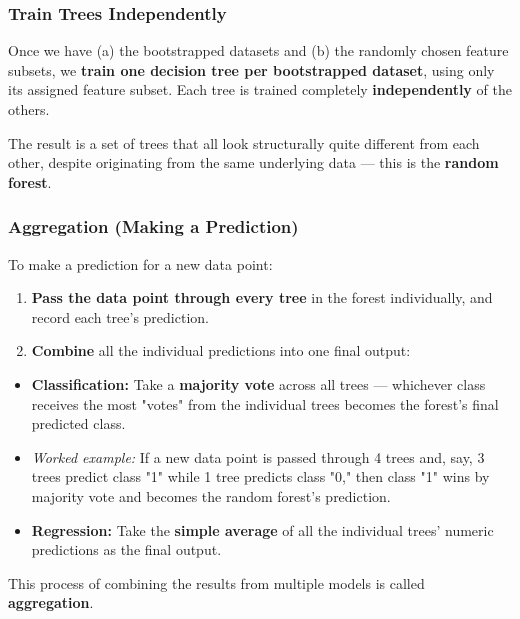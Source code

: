 \documentclass[12pt,openany]{book}
\begin{document}
\subsubsection{Train Trees Independently}


Once we have (a) the bootstrapped datasets and (b) the randomly chosen feature subsets, we \textbf{train one decision tree per bootstrapped dataset}, using only its assigned feature subset. Each tree is trained completely \textbf{independently} of the others.

The result is a set of trees that all look structurally quite different from each other, despite originating from the same underlying data --- this is the \textbf{random forest}.

\subsubsection{Aggregation (Making a Prediction)}


To make a prediction for a new data point:

\begin{enumerate}[leftmargin=*]
    \item \textbf{Pass the data point through every tree} in the forest individually, and record each tree's prediction.
    \item \textbf{Combine} all the individual predictions into one final output:
\end{enumerate}

\begin{itemize}[leftmargin=*]
    \item \textbf{Classification:} Take a \textbf{majority vote} across all trees --- whichever class receives the most "votes" from the individual trees becomes the forest's final predicted class.
    \item \textit{Worked example:} If a new data point is passed through 4 trees and, say, 3 trees predict class "1" while 1 tree predicts class "0," then class "1" wins by majority vote and becomes the random forest's prediction.
    \item \textbf{Regression:} Take the \textbf{simple average} of all the individual trees' numeric predictions as the final output.

\end{itemize}

This process of combining the results from multiple models is called \textbf{aggregation}.

\medskip
\end{document}
